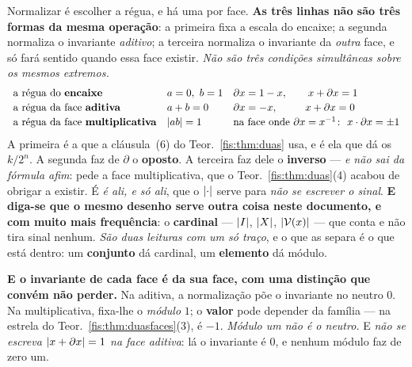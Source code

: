 \documentclass[livro.tex]{subfiles}
\begin{document}

\begin{observacao}\label{fis:obs:reguas}
Normalizar é escolher a régua, e há uma por face. \textbf{As três linhas não são
três formas da mesma operação}: a primeira fixa a escala do encaixe; a segunda
normaliza o invariante \emph{aditivo}; a terceira normaliza o invariante da
\emph{outra} face, e só fará sentido quando essa face existir. \emph{Não são três
condições simultâneas sobre os mesmos extremos.}
\[
\begin{array}{lll}
\text{a régua do \textbf{encaixe}} & a=0,\ b=1 & \partial x=1-x,\qquad x+\partial x=1\\[2pt]
\text{a régua da face \textbf{aditiva}} & a+b=0 & \partial x=-x,\qquad\ \ x+\partial x=0\\[2pt]
\text{a régua da face \textbf{multiplicativa}} & \lvert ab\rvert=1 & \text{na face onde }\partial x=x^{-1}\colon\ x\cdot\partial x=\pm1
\end{array}
\]
A primeira é a que a cláusula~(6) do Teor.~\ref{fis:thm:duas} usa, e é ela que dá
os $k/2^{n}$. A segunda faz de $\partial$ o \textbf{oposto}. A terceira faz dele
o \textbf{inverso} --- \emph{e não sai da fórmula afim}: pede a face
multiplicativa, que o Teor.~\ref{fis:thm:duas}(4) acabou de obrigar a existir. É
\emph{é ali, e só ali}, que o $\lvert \cdot\rvert$ serve para \emph{não se escrever o
sinal}. \textbf{E diga-se que o mesmo desenho serve outra coisa neste documento, e
com muito mais frequência}: o \textbf{cardinal} --- $\lvert I\rvert$, $\lvert X\rvert$,
$\lvert \mathcal{V}(x)\rvert$ --- que conta e não tira sinal nenhum. \emph{São duas
leituras com um só traço}, e o que as separa é o que está dentro: um
\textbf{conjunto} dá cardinal, um \textbf{elemento} dá módulo.

\medskip\noindent\textbf{E o invariante de cada face é da sua face, com uma
distinção que convém não perder.} Na aditiva, a normalização põe o invariante no
neutro $0$. Na multiplicativa, fixa-lhe o \emph{módulo} $1$; o \textbf{valor}
pode depender da família --- na estrela do Teor.~\ref{fis:thm:duasfaces}(3), é $-1$.
\emph{Módulo um não é o neutro.} E \emph{não se escreva $\lvert x+\partial x\rvert=1$ na
face aditiva}: lá o invariante é $0$, e nenhum módulo faz de zero um.
\end{observacao}
\end{document}
